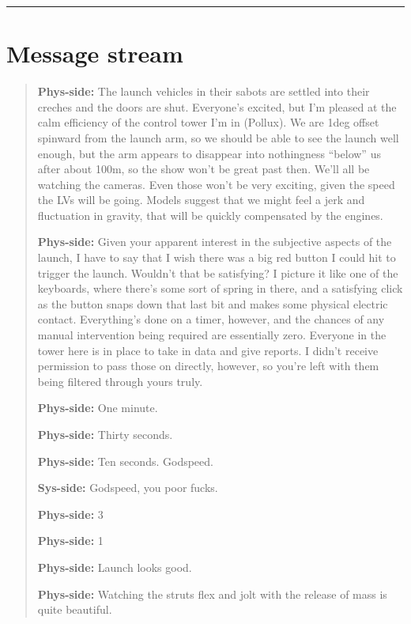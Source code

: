 \begin{center}\rule{0.5\linewidth}{0.5pt}\end{center}

\hypertarget{message-stream}{%
\section*{Message stream}\label{message-stream}}

\begin{quote}
\textbf{Phys-side:} The launch vehicles in their sabots are settled into their creches and the doors are shut. Everyone's excited, but I'm pleased at the calm efficiency of the control tower I'm in (Pollux). We are 1deg offset spinward from the launch arm, so we should be able to see the launch well enough, but the arm appears to disappear into nothingness ``below'' us after about 100m, so the show won't be great past then. We'll all be watching the cameras. Even those won't be very exciting, given the speed the LVs will be going. Models suggest that we might feel a jerk and fluctuation in gravity, that will be quickly compensated by the engines.

\textbf{Phys-side:} Given your apparent interest in the subjective aspects of the launch, I have to say that I wish there was a big red button I could hit to trigger the launch. Wouldn't that be satisfying? I picture it like one of the keyboards, where there's some sort of spring in there, and a satisfying click as the button snaps down that last bit and makes some physical electric contact. Everything's done on a timer, however, and the chances of any manual intervention being required are essentially zero. Everyone in the tower here is in place to take in data and give reports. I didn't receive permission to pass those on directly, however, so you're left with them being filtered through yours truly.

\textbf{Phys-side:} One minute.

\textbf{Phys-side:} Thirty seconds.

\textbf{Phys-side:} Ten seconds. Godspeed.

\textbf{Sys-side:} Godspeed, you poor fucks.

\textbf{Phys-side:} 3

\textbf{Phys-side:} 1

\textbf{Phys-side:} Launch looks good.

\textbf{Phys-side:} Watching the struts flex and jolt with the release of mass is quite beautiful.


\end{quote}
